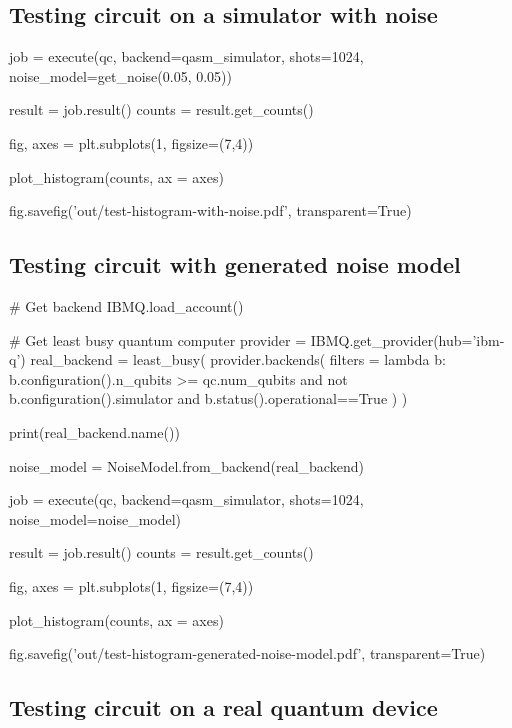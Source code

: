 \subsection{Testing circuit on a simulator with noise}
\label{subsec:testing-circuit-simulator-noise}

\begin{python}
job = execute(qc, backend=qasm_simulator, shots=1024, noise_model=get_noise(0.05, 0.05))

result = job.result()
counts = result.get_counts()

fig, axes = plt.subplots(1, figsize=(7,4))

plot_histogram(counts, ax = axes)

fig.savefig('out/test-histogram-with-noise.pdf', transparent=True)
\end{python}

\subsection{Testing circuit with generated noise model}
\label{subsec:testing-circuit-generated-noise-model}

\begin{python}
# Get backend
IBMQ.load_account()

# Get least busy quantum computer
provider = IBMQ.get_provider(hub='ibm-q')
real_backend = least_busy(
    provider.backends(
        filters = lambda b: b.configuration().n_qubits >= qc.num_qubits
            and not b.configuration().simulator and b.status().operational==True
    )
)

print(real_backend.name())

noise_model = NoiseModel.from_backend(real_backend)

job = execute(qc, backend=qasm_simulator, shots=1024, noise_model=noise_model)

result = job.result()
counts = result.get_counts()

fig, axes = plt.subplots(1, figsize=(7,4))

plot_histogram(counts, ax = axes)

fig.savefig('out/test-histogram-generated-noise-model.pdf', transparent=True)
\end{python}

\subsection{Testing circuit on a real quantum device}
\label{subsec:testing-circuit-real-device}

